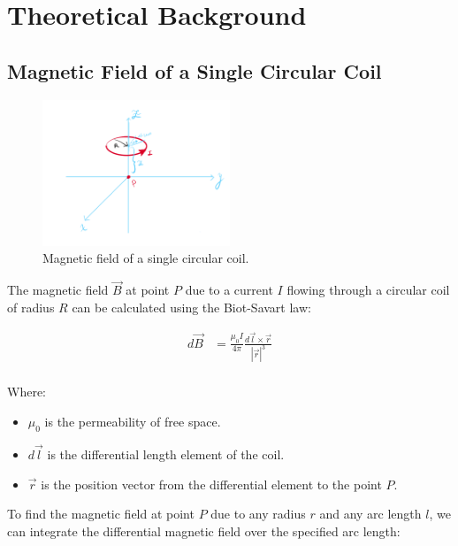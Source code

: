\chapter{Theoretical Background}

\section{Magnetic Field of a Single Circular Coil}

\begin{figure}[h]
\centering
\includegraphics[width=0.5\textwidth]{assets/single-coil-magnetic-field-hand-drawn.png}
\caption{Magnetic field of a single circular coil.}
\end{figure}

The magnetic field $\vec{B}$ at point $P$ due to a current $I$ flowing through a circular coil of radius $R$ can be calculated using the Biot-Savart law:

\begin{align*} 
    d\vec{B} &= \frac{\mu_0 I}{4\pi} \frac{d\vec{l} \times \vec{r}}{|\vec{r}|^3} \\
\end{align*}

\noindent Where:
\begin{itemize}
    \item $\mu_0$ is the permeability of free space.
    \item $d\vec{l}$ is the differential length element of the coil.
    \item $\vec{r}$ is the position vector from the differential element to the point $P$.
\end{itemize}

\newpage
\thispagestyle{plain}

To find the magnetic field at point $P$ due to any radius $r$ and any arc length $l$, we can integrate the differential magnetic field over the specified arc length:

